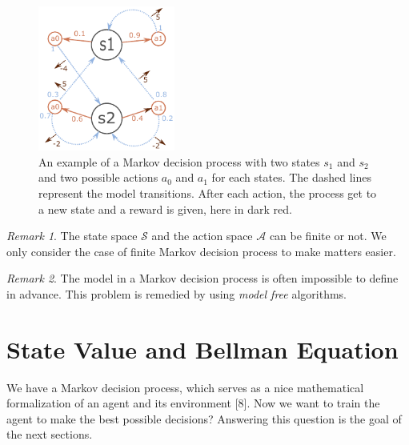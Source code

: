 \documentclass[
  letterpaper,
]{report}
\theoremstyle{plain}
\theoremstyle{definition}
\theoremstyle{definition}
\theoremstyle{remark}
\newtheorem*{remark}{Remark}
\begin{document}
\begin{figure}

{\centering \includegraphics[width=0.4\textwidth,height=\textheight]{./images/MDP.pdf}

}

\caption{\label{fig-MDP_example}An example of a Markov decision process
with two states \(s_1\) and \(s_2\) and two possible actions \(a_0\) and
\(a_1\) for each states. The dashed lines represent the model
transitions. After each action, the process get to a new state and a
reward is given, here in dark red.}

\end{figure}

\begin{remark}

The state space \(\mathcal{S}\) and the action space \(\mathcal{A}\) can
be finite or not. We only consider the case of finite Markov decision
process to make matters easier.

\end{remark}

\begin{remark}

The model in a Markov decision process is often impossible to define in
advance. This problem is remedied by using \emph{model free} algorithms.

\end{remark}

\hypertarget{state-value-and-bellman-equation}{%
\section{State Value and Bellman
Equation}\label{state-value-and-bellman-equation}}

We have a Markov decision process, which serves as a nice mathematical
formalization of an agent and its environment {[}8{]}. Now we want to
train the agent to make the best possible decisions? Answering this
question is the goal of the next sections.
\end{document}
